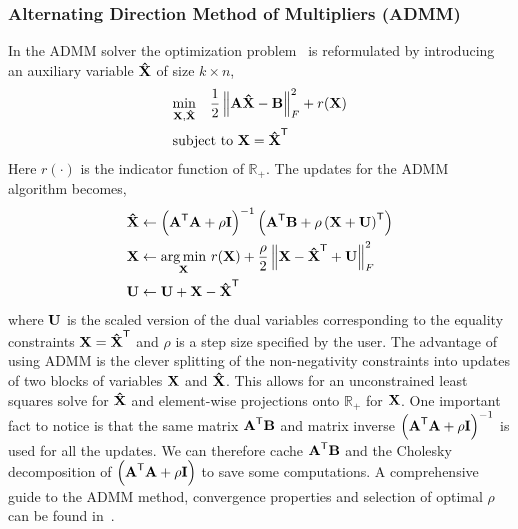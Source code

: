 \subsubsection{Alternating Direction Method of Multipliers (ADMM)}
In the ADMM solver the optimization problem~ is reformulated by introducing an auxiliary variable $\M{\hat{X}}$ of size $k \times n$,
\begin{align}
\begin{split}
&\underset{\M{X},\M{\hat{X}}}{\min} \quad \frac 1 2 \left\lVert \M{A}\M{\hat{X}} - \M{B}\right\rVert_F^2 + r(\M{X}) \\
&\textnormal{subject to } \M{X} = \M{\hat{X}}^\Tra 
\end{split}
\label{eqn:admmnls}
\end{align}
Here $r(\cdot)$ is the indicator function of $\mathbb{R}_+$. The updates for the ADMM algorithm becomes,
\begin{align}
\begin{split}
\M{\hat{X}} &\leftarrow \left(\M{A}^\Tra\M{A} + \rho\M{I} \right)^{-1}\left(\M{A}^\Tra\M{B} + \rho\left(\M{X} + \M{U}\right)^\Tra\right) \\
\M{X} &\leftarrow \underset{\M{X}}{\argmin}\ r(\M{X}) + \frac{\rho}{2} \left\lVert \M{X} - \M{\hat{X}}^\Tra + \M{U}\right\rVert_F^2 \\
\M{U} &\leftarrow \M{U} + \M{X} - \M{\hat{X}}^\Tra
\end{split}
\end{align}
where $\M{U}$ is the scaled version of the dual variables corresponding to the equality constraints $\M{X} = \M{\hat{X}}^\Tra$ and $\rho$ is a step size specified by the user. The advantage of using ADMM is the clever splitting of the non-negativity constraints into updates of two blocks of variables $\M{X}$ and $\M{\hat{X}}$. This allows for an unconstrained least squares solve for $\M{\hat{X}}$ and element-wise projections onto $\mathbb{R}_+$ for $\M{X}$. One important fact to notice is that the same matrix $\M{A}^\Tra\M{B}$ and matrix inverse $\Br{\M{A}^\Tra\M{A} + \rho \M{I}}^{-1}$ is used for all the updates. We can therefore cache $\M{A}^\Tra\M{B}$ and the Cholesky decomposition of  $\Br{\M{A}^\Tra\M{A} + \rho \M{I}}$ to save some computations. A comprehensive guide to the ADMM method, convergence properties and selection of optimal $\rho$ can be found in~\cite{boyd2011distributed}.

